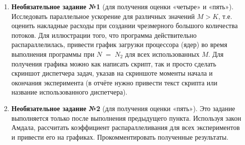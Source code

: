\begin{enumerate}
     отчёт о проделанной работе.
		
     к устным вопросам на защите.
		
    \item\textbf{Необязательное задание №1} (для получения оценки «четыре» и «пять»). Исследовать параллельное ускорение для различных значений $M > K$, т.е. оценить накладные расходы при создании чрезмерного большого количества потоков. Для иллюстрации того, что программа действительно распараллелилась, привести график загрузки процессора (ядер) во время выполнения программы при $N\;=\;N_2$ для всех использованных $M$. Для получения графика можно как написать скрипт, так и просто сделать скриншот диспетчера задач, указав на скриншоте моменты начала и окончания эксперимента (в отчёте нужно привести текст скрипта или название использованного диспетчера).
		
    \item\textbf{Необязательное задание №2} (для получения оценки «пять»). Это задание выполняется только после выполнения предыдущего пункта. Используя закон Амдала, рассчитать коэффициент распараллеливания для всех экспериментов и привести его на графиках. Прокомментировать полученные результаты.
\end{enumerate}
